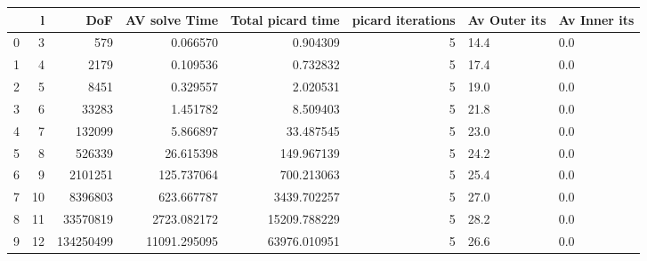 \begin{tabular}{lrrrrrll}
\toprule
{} &   l &        DoF &  AV solve Time &  Total picard time &  picard iterations & Av Outer its & Av Inner its \\
\midrule
0 &   3 &        579 &       0.066570 &           0.904309 &                  5 &         14.4 &          0.0 \\
1 &   4 &       2179 &       0.109536 &           0.732832 &                  5 &         17.4 &          0.0 \\
2 &   5 &       8451 &       0.329557 &           2.020531 &                  5 &         19.0 &          0.0 \\
3 &   6 &      33283 &       1.451782 &           8.509403 &                  5 &         21.8 &          0.0 \\
4 &   7 &     132099 &       5.866897 &          33.487545 &                  5 &         23.0 &          0.0 \\
5 &   8 &     526339 &      26.615398 &         149.967139 &                  5 &         24.2 &          0.0 \\
6 &   9 &    2101251 &     125.737064 &         700.213063 &                  5 &         25.4 &          0.0 \\
7 &  10 &    8396803 &     623.667787 &        3439.702257 &                  5 &         27.0 &          0.0 \\
8 &  11 &   33570819 &    2723.082172 &       15209.788229 &                  5 &         28.2 &          0.0 \\
9 &  12 &  134250499 &   11091.295095 &       63976.010951 &                  5 &         26.6 &          0.0 \\
\bottomrule
\end{tabular}
